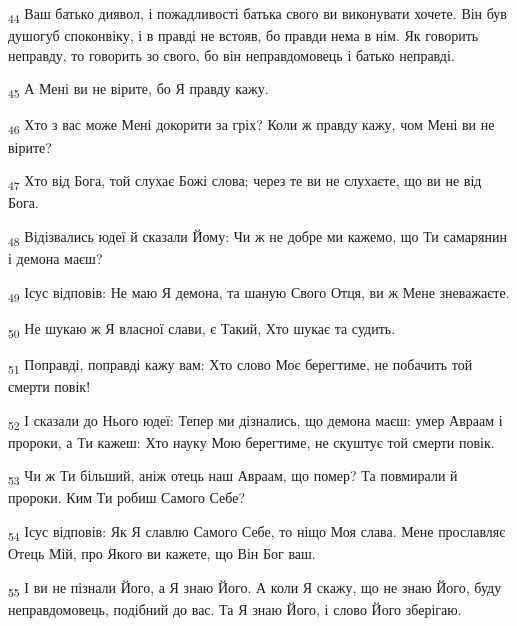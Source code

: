 \begin{tcolorbox}
\textsubscript{44} Ваш батько диявол, і пожадливості батька свого ви виконувати хочете. Він був душогуб споконвіку, і в правді не встояв, бо правди нема в нім. Як говорить неправду, то говорить зо свого, бо він неправдомовець і батько неправді.
\end{tcolorbox}
\begin{tcolorbox}
\textsubscript{45} А Мені ви не вірите, бо Я правду кажу.
\end{tcolorbox}
\begin{tcolorbox}
\textsubscript{46} Хто з вас може Мені докорити за гріх? Коли ж правду кажу, чом Мені ви не вірите?
\end{tcolorbox}
\begin{tcolorbox}
\textsubscript{47} Хто від Бога, той слухає Божі слова; через те ви не слухаєте, що ви не від Бога.
\end{tcolorbox}
\begin{tcolorbox}
\textsubscript{48} Відізвались юдеї й сказали Йому: Чи ж не добре ми кажемо, що Ти самарянин і демона маєш?
\end{tcolorbox}
\begin{tcolorbox}
\textsubscript{49} Ісус відповів: Не маю Я демона, та шаную Свого Отця, ви ж Мене зневажаєте.
\end{tcolorbox}
\begin{tcolorbox}
\textsubscript{50} Не шукаю ж Я власної слави, є Такий, Хто шукає та судить.
\end{tcolorbox}
\begin{tcolorbox}
\textsubscript{51} Поправді, поправді кажу вам: Хто слово Моє берегтиме, не побачить той смерти повік!
\end{tcolorbox}
\begin{tcolorbox}
\textsubscript{52} І сказали до Нього юдеї: Тепер ми дізнались, що демона маєш: умер Авраам і пророки, а Ти кажеш: Хто науку Мою берегтиме, не скуштує той смерти повік.
\end{tcolorbox}
\begin{tcolorbox}
\textsubscript{53} Чи ж Ти більший, аніж отець наш Авраам, що помер? Та повмирали й пророки. Ким Ти робиш Самого Себе?
\end{tcolorbox}
\begin{tcolorbox}
\textsubscript{54} Ісус відповів: Як Я славлю Самого Себе, то ніщо Моя слава. Мене прославляє Отець Мій, про Якого ви кажете, що Він Бог ваш.
\end{tcolorbox}
\begin{tcolorbox}
\textsubscript{55} І ви не пізнали Його, а Я знаю Його. А коли Я скажу, що не знаю Його, буду неправдомовець, подібний до вас. Та Я знаю Його, і слово Його зберігаю.
\end{tcolorbox}

